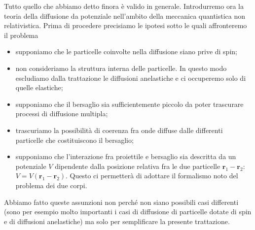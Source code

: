 \documentclass[a4paper,fleqn,twoside,12pt]{article}
\begin{document}
Tutto quello che abbiamo detto finora è valido in generale.  Introdurremo ora la
teoria della diffusione da potenziale nell'ambito della meccanica quantistica
non relativistica.  Prima di procedere precisiamo le ipotesi sotto le quali
affronteremo il problema
\begin{itemize}
\item supponiamo che le particelle coinvolte nella diffusione siano prive di
  spin;
\item non consideriamo la struttura interna delle particelle.  In questo modo
  escludiamo dalla trattazione le diffusioni anelastiche e ci occuperemo solo di
  quelle elastiche;
\item supponiamo che il bersaglio sia sufficientemente piccolo da poter
  trascurare processi di diffusione multipla;
\item trascuriamo la possibilità di coerenza fra onde diffuse dalle differenti
  particelle che costituiscono il bersaglio;
\item supponiamo che l'interazione fra proiettile e bersaglio sia descritta da
  un potenziale $V$ dipendente dalla posizione relativa fra le due particelle
  $\bm{r}_{1} - \bm{r}_{2}$: $V = V(\bm{r}_{1} - \bm{r}_{2})$.  Questo ci
  permetterà di adottare il formalismo noto del problema dei due corpi.
\end{itemize}
Abbiamo fatto queste assunzioni non perché non siano possibili casi differenti
(sono per esempio molto importanti i casi di diffusione di particelle dotate di
spin e di diffusioni anelastiche) ma solo per semplificare la presente
trattazione.
\end{document}
